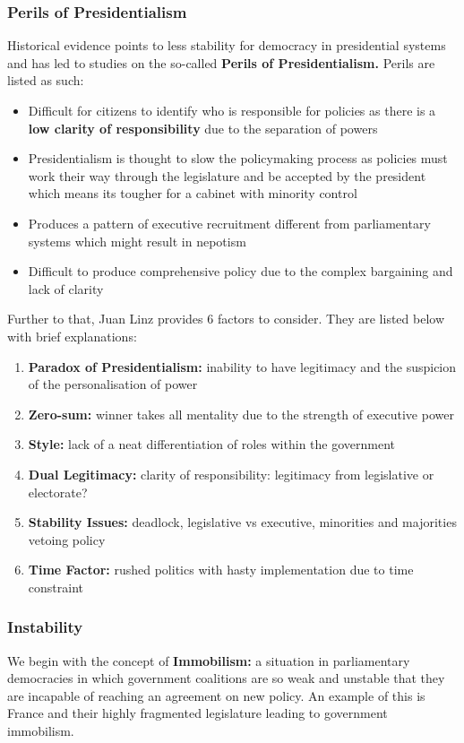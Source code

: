 \documentclass[12pt, letterpaper]{article}
\begin{document}
\subsubsection{Perils of Presidentialism}
Historical evidence points to less stability for democracy in presidential systems and has led to studies on the so-called \textbf{Perils of Presidentialism.} Perils are listed as such:
\begin{itemize}
	\item Difficult for citizens to identify who is responsible for policies as there is a \textbf{low clarity of responsibility} due to the separation of powers
	\item Presidentialism is thought to slow the policymaking process as policies must work their way through the legislature and be accepted by the president which means its tougher for a cabinet with minority control
	\item Produces a pattern of executive recruitment different from parliamentary systems which might result in nepotism
	\item Difficult to produce comprehensive policy due to the complex bargaining and lack of clarity
\end{itemize}
Further to that, Juan Linz provides 6 factors to consider. They are listed below with brief explanations:
\begin{enumerate}
	\item \textbf{Paradox of Presidentialism:} inability to have legitimacy and the suspicion of the personalisation of power
	\item \textbf{Zero-sum:} winner takes all mentality due to the strength of executive power
	\item \textbf{Style:} lack of a neat differentiation of roles within the government
	\item \textbf{Dual Legitimacy:} clarity of responsibility: legitimacy from legislative or electorate?
	\item \textbf{Stability Issues:} deadlock, legislative vs executive, minorities and majorities vetoing policy
	\item \textbf{Time Factor:} rushed politics with hasty implementation due to time constraint
\end{enumerate}



\subsubsection{Instability}
We begin with the concept of \textbf{Immobilism:} a situation in parliamentary democracies in which government coalitions are so weak and unstable that they are incapable of reaching an agreement on new policy. An example of this is France and their highly fragmented legislature leading to government immobilism.
\end{document}
